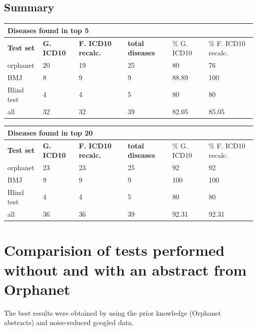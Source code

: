 \documentclass[10pt,letterpaper,two column,final]{article}
\begin{document}
\subsection{Summary}
\label{app:summary_icd10_icd10recalc}

\begin{center}
\begin{small}
\begin{tabular}{l|p{2.2cm}p{2.2cm}||p{1.2cm}p{2.2cm}p{2.2cm}}
	\multicolumn{6}{l}{\textbf{Diseases found in top 5}} \\ \hline
\textbf{Test set} & \textbf{G. ICD10} &	\textbf{F. ICD10 recalc.}	 &	\textbf{total diseases} &	\% G. ICD10 &\% F. ICD10 recalc. \\ \hline
orphanet    &     20  &  19    &     25  &   80   & 76 \\
BMJ	        &   8    &    9  &    9   &    88.89  & 100 \\
Blind test	&   4    &    4  &    5   &    80  & 80 \\ \hline \hline
all	        &   32    &   32   &   39    &   82.05   & 85.05 \\ \hline
\end{tabular}
\end{small}
\end{center}

\begin{center}
\begin{small}
\begin{tabular}{l|p{2.2cm}p{2.2cm}||p{1.2cm}p{2.2cm}p{2.2cm}}
	\multicolumn{6}{l}{\textbf{Diseases found in top 20}} \\ \hline
\textbf{Test set} & \textbf{G. ICD10} &	\textbf{F. ICD10 recalc.}	 &	\textbf{total diseases} &	\% G. ICD10 &\% F. ICD10 recalc. \\ \hline
orphanet    &   23    &  23    &   25    &   92   & 92 \\
BMJ	        &    9   &   9   &     9  &   100   & 100 \\
Blind test	&    4   &   4   &    5   &   80   & 80 \\ \hline \hline
all	        &    36   &  36    &   39    &  92.31  & 92.31 \\ \hline
\end{tabular}
\end{small}
\end{center}



\newpage
\section{Comparision of tests performed without and with an abstract from Orphanet}
\label{app:with_without}
The best results were obtained by using the prior knowledge (Orphanet abstracts) and noise-reduced googled data.
\end{document}
